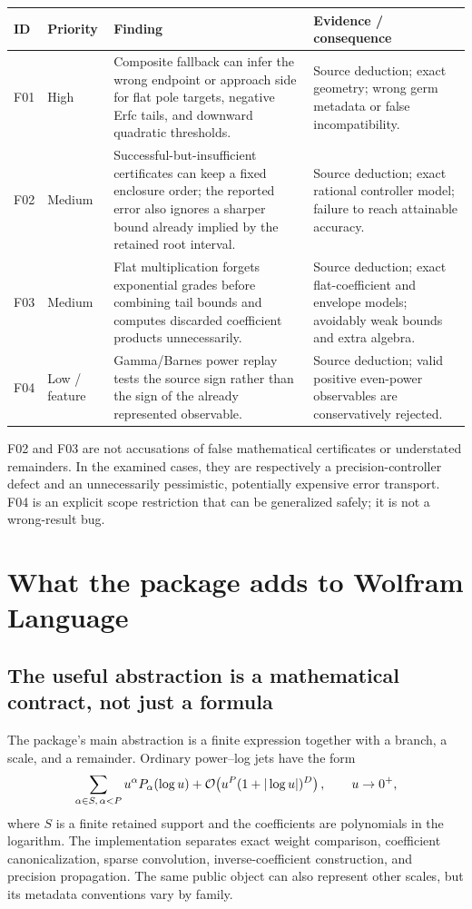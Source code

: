 \begin{longtable}{@{}R{0.07\textwidth}R{0.13\textwidth}R{0.48\textwidth}R{0.24\textwidth}@{}}
\toprule
ID & Priority & Finding & Evidence / consequence\\\midrule\endhead
F01 & High & Composite fallback can infer the wrong endpoint or approach side for flat pole targets, negative Erfc tails, and downward quadratic thresholds. & Source deduction; exact geometry; wrong germ metadata or false incompatibility.\\[0.6em]
F02 & Medium & Successful-but-insufficient certificates can keep a fixed enclosure order; the reported error also ignores a sharper bound already implied by the retained root interval. & Source deduction; exact rational controller model; failure to reach attainable accuracy.\\[0.6em]
F03 & Medium & Flat multiplication forgets exponential grades before combining tail bounds and computes discarded coefficient products unnecessarily. & Source deduction; exact flat-coefficient and envelope models; avoidably weak bounds and extra algebra.\\[0.6em]
F04 & Low / feature & Gamma/Barnes power replay tests the source sign rather than the sign of the already represented observable. & Source deduction; valid positive even-power observables are conservatively rejected.\\
\bottomrule
\end{longtable}

F02 and F03 are not accusations of false mathematical certificates or understated remainders. In the examined cases, they are respectively a precision-controller defect and an unnecessarily pessimistic, potentially expensive error transport. F04 is an explicit scope restriction that can be generalized safely; it is not a wrong-result bug.

\section{What the package adds to Wolfram Language}

\subsection{The useful abstraction is a mathematical contract, not just a formula}

The package's main abstraction is a finite expression together with a branch, a scale, and a remainder. Ordinary power--log jets have the form
\begin{equation}\label{eq:jet}
  \sum_{\alpha\in S,\,\alpha<P}u^\alpha P_\alpha(\log u)
  +\mathcal{O}\!\left(u^P(1+|\log u|)^D\right),\qquad u\to0^+,
\end{equation}
where $S$ is a finite retained support and the coefficients are polynomials in the logarithm. The implementation separates exact weight comparison, coefficient canonicalization, sparse convolution, inverse-coefficient construction, and precision propagation. The same public object can also represent other scales, but its metadata conventions vary by family.\cite{core,seriesops}

